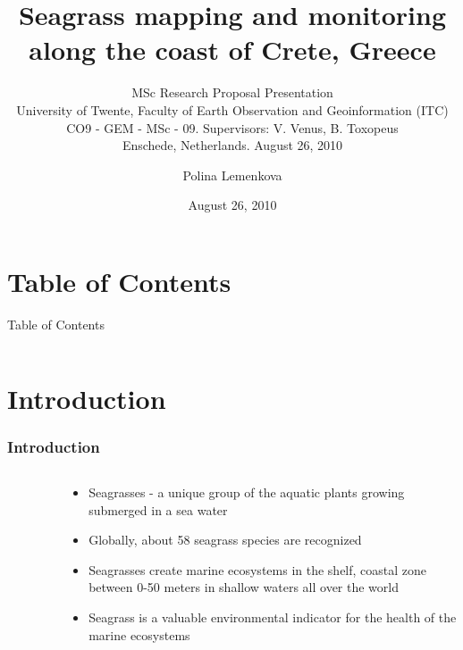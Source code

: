 \documentclass[pdflatex,compress,8pt,
	xcolor={dvipsnames,dvipsnames,svgnames,x11names,table},
	hyperref={colorlinks = true,breaklinks = true, urlcolor = NavyBlue, breaklinks = true}]{beamer}
\title[MSc Research Proposal Seagrass mapping and monitoring along the coast of Crete, Greece 08/2010]{Seagrass mapping and monitoring along the coast of Crete, Greece}
\subtitle{MSc Research Proposal Presentation\\
\footnotesize{University of Twente, Faculty of Earth Observation and Geoinformation (ITC)\\
CO9 - GEM - MSc - 09. Supervisors: V. Venus, B. Toxopeus\\
Enschede, Netherlands. August 26, 2010}}
\date{August 26, 2010}
\author{Polina Lemenkova}
\begin{document}
\maketitle

\section*{Table of Contents}
\begin{frame}{Table of Contents}
    \begin{columns}[onlytextwidth,T]
        \begin{column}{.45\textwidth}
            \small{\tableofcontents[sections=1-5]}
        \end{column}
        \begin{column}{.45\textwidth}
            \small{\tableofcontents[sections=6-11]}
        \end{column}
    \end{columns}
\end{frame}

\section{Introduction}
\begin{frame}\frametitle{Introduction}

\begin{minipage}[0.4\textheight]{\textwidth}
\begin{columns}[T]
\begin{column}{0.5\textwidth}
\vspace{2em}
\begin{figure}[H]
	\centering
			\hspace{5mm}
\end{figure}
\end{column}
\begin{column}{0.5\textwidth}
\vspace{4em} 
\begin{itemize}
	\item Seagrasses - a unique group of the aquatic plants growing submerged in a sea water
	\item Globally, about 58 seagrass species are recognized
	\item Seagrasses create marine ecosystems in the shelf, coastal zone between 0-50 meters in shallow waters all over the world
	\item Seagrass is a valuable environmental indicator for the health of the marine ecosystems
\end{itemize}
\end{column}
\end{columns}
\end{minipage}
\end{frame}
\end{document}
